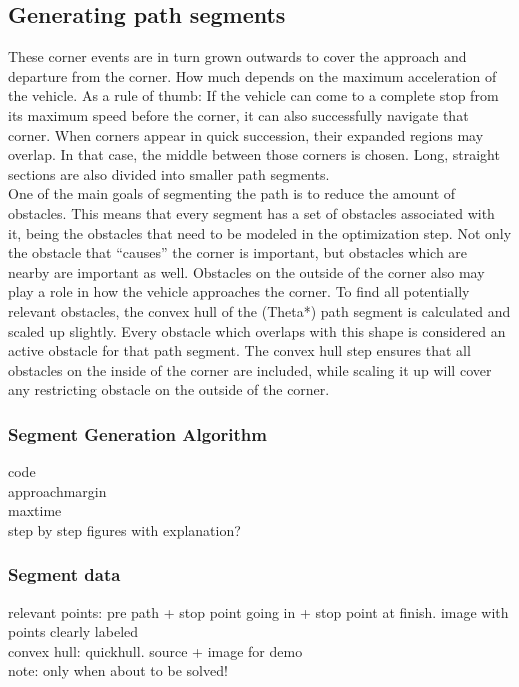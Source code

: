 \subsection{Generating path segments}
These corner events are in turn grown outwards to cover the approach and departure from the corner. How much depends on the maximum acceleration of the vehicle. As a rule of thumb: If the vehicle can come to a complete stop from its maximum speed before the corner, it can also successfully navigate that corner. When corners appear in quick succession, their expanded regions may overlap. In that case, the middle between those corners is chosen. Long, straight sections are also divided into smaller path segments.\\
One of the main goals of segmenting the path is to reduce the amount of obstacles. This means that every segment has a set of obstacles associated with it, being the obstacles that need to be modeled in the optimization step. Not only the obstacle that ``causes'' the corner is important, but obstacles which are nearby are important as well. Obstacles on the outside of the corner also may play a role in how the vehicle approaches the corner. To find all potentially relevant obstacles, the convex hull of the (Theta*) path segment is calculated and scaled up slightly. Every obstacle which overlaps with this shape is considered an active obstacle for that path segment. The convex hull step ensures that all obstacles on the inside of the corner are included, while scaling it up will cover any restricting obstacle on the outside of the corner.

\subsubsection{Segment Generation Algorithm}
code \\
approachmargin \\
maxtime \\
step by step figures with explanation? 
\subsubsection{Segment data}
relevant points: pre path + stop point going in + stop point at finish. image with points clearly labeled \\
convex hull: quickhull. source + image for demo \\
note: only when about to be solved!
